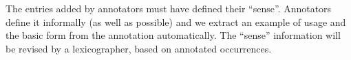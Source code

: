 The entries added by annotators must have defined their ``sense''. Annotators define it informally (as well as possible) and we extract an example of usage and the basic form from the annotation automatically. The ``sense'' information will be revised by a lexicographer, based on annotated occurrences.